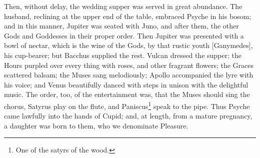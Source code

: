 \documentclass[12pt]{article}
\begin{document}
Then, without delay, the wedding supper was served in great abundance. The
husband, reclining at the upper end of the table, embraced Psyche in his bosom;
and in this manner, Jupiter was seated with Juno, and after them, the other
Gods and Goddesses in their proper order. Then Jupiter was presented with a
bowl of nectar, which is the wine of the Gods, by that rustic youth
[Ganymedes], his cup-bearer; but Bacchus supplied the rest. Vulcan dressed the
supper; the Hours purpled over every thing with roses, and other fragrant
flowers; the Graces scattered balsam; the Muses sang melodiously; Apollo
accompanied the lyre with his voice; and Venus beautifully danced with steps in
unison with the delightful music. The order, too, of the entertainment was,
that the Muses should sing the chorus, Satyrus play on the flute, and
Paniscus\footnote{One of the satyrs of the wood.} speak to the pipe. Thus
Psyche came lawfully into the hands of Cupid; and, at length, from a mature
pregnancy, a daughter was born to them, who we denominate Pleasure.
\end{document}
